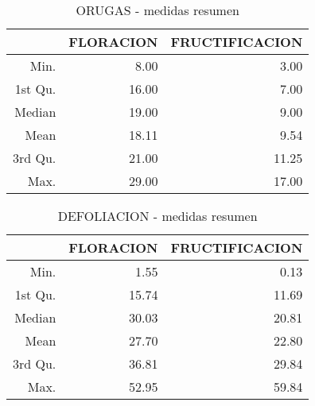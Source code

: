 \begin{table}[ht]
\centering
\begin{tabular}{rrr}
  \hline
 & FLORACION & FRUCTIFICACION \\ 
  \hline
Min. & 8.00 & 3.00 \\ 
  1st Qu. & 16.00 & 7.00 \\ 
  Median & 19.00 & 9.00 \\ 
  Mean & 18.11 & 9.54 \\ 
  3rd Qu. & 21.00 & 11.25 \\ 
  Max. & 29.00 & 17.00 \\ 
   \hline
\end{tabular}
\caption{ORUGAS - medidas resumen} 
\label{table:summary_orugas}
\end{table}
\begin{table}[ht]
\centering
\begin{tabular}{rrr}
  \hline
 & FLORACION & FRUCTIFICACION \\ 
  \hline
Min. & 1.55 & 0.13 \\ 
  1st Qu. & 15.74 & 11.69 \\ 
  Median & 30.03 & 20.81 \\ 
  Mean & 27.70 & 22.80 \\ 
  3rd Qu. & 36.81 & 29.84 \\ 
  Max. & 52.95 & 59.84 \\ 
   \hline
\end{tabular}
\caption{DEFOLIACION - medidas resumen} 
\label{table:summary_defoliacion}
\end{table}

